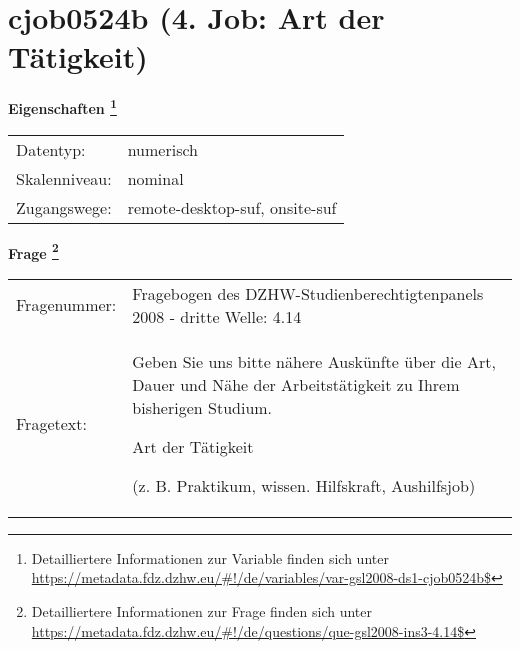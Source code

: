 
    \setcounter{footnote}{0}

    \vspace*{-1.8cm}
	\section{cjob0524b (4. Job: Art der Tätigkeit)}
	\label{section:cjob0524b}



    \vspace*{0.5cm}
    \noindent\textbf{Eigenschaften
	\footnote{Detailliertere Informationen zur Variable finden sich unter
		\url{https://metadata.fdz.dzhw.eu/\#!/de/variables/var-gsl2008-ds1-cjob0524b$}}}\\
	\begin{tabularx}{\hsize}{@{}lX}
	Datentyp: & numerisch \\
	Skalenniveau: & nominal \\
	Zugangswege: &
	  remote-desktop-suf, 
	  onsite-suf
 \\
    \end{tabularx}



				\vspace*{0.5cm}
                \noindent\textbf{Frage
	                \footnote{Detailliertere Informationen zur Frage finden sich unter
		              \url{https://metadata.fdz.dzhw.eu/\#!/de/questions/que-gsl2008-ins3-4.14$}}}\\
				\begin{tabularx}{\hsize}{@{}lX}
					Fragenummer: &
					  Fragebogen des DZHW-Studienberechtigtenpanels 2008 - dritte Welle:
					  4.14
 \\
					Fragetext: & Geben Sie uns bitte nähere Auskünfte über die Art, Dauer und Nähe der Arbeitstätigkeit zu Ihrem bisherigen Studium.\par  Art der Tätigkeit\par  (z. B. Praktikum, wissen. Hilfskraft, Aushilfsjob) \\
				\end{tabularx}





